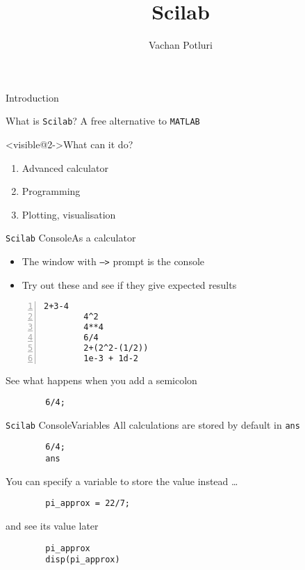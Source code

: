 \documentclass[%
    10pt,
    xcolor={dvipsnames},
]{beamer}
\title{Scilab}
\author[Vachan Potluri]{%
    Vachan Potluri\\
    \email{vachanpotluri@iitb.ac.in}
}
\newcommand{\inlinecode}[1]{\texttt{#1}} %
\newcommand{\matlab}{\texttt{MATLAB}}
\newcommand{\scilab}{\texttt{Scilab}}
\begin{document}
\setlength\leftmargini{1em} %
\setlength\leftmarginii{\leftmargini} %
\setlength\leftmarginiii{\leftmarginii} %

{
    \begin{frame}
        \titlepage
    \end{frame}
}

\begin{frame}{Introduction}
    \begin{block}{What is \scilab?}
        A free alternative to \matlab
    \end{block}
    \begin{block}<visible@2->{What can it do?}
        \begin{enumerate}
            \item Advanced calculator
            \item Programming
            \item Plotting, visualisation
        \end{enumerate}
    \end{block}
\end{frame}

\begin{frame}[fragile]{\scilab{} Console}{As a calculator}
    \begin{itemize}
        \item The window with \inlinecode{-->} prompt is the console
        \item Try out these and see if they give expected results
    \end{itemize}
    \begin{lstlisting}[numbers=left]
        2+3-4
        4^2
        4**4
        6/4
        2+(2^2-(1/2))
        1e-3 + 1d-2
    \end{lstlisting}
    See what happens when you add a semicolon
    \begin{lstlisting}
        6/4;
    \end{lstlisting}
\end{frame}

\begin{frame}[fragile]{\scilab{} Console}{Variables}
    All calculations are stored by default in \inlinecode{ans}
    \begin{lstlisting}
        6/4;
        ans
    \end{lstlisting}
    You can specify a variable to store the value instead \ldots
    \begin{lstlisting}
        pi_approx = 22/7;
    \end{lstlisting}
    and see its value later
    \begin{lstlisting}
        pi_approx
        disp(pi_approx)
    \end{lstlisting}
\end{frame}
\end{document}
